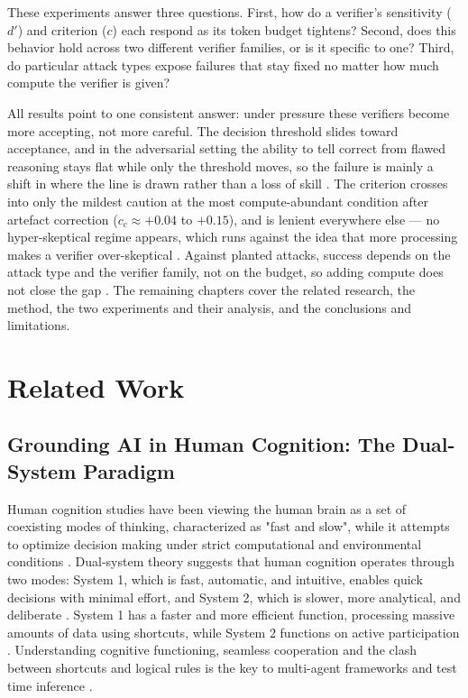 \documentclass[12pt, a4paper, oneside]{report}
\begin{document}
These experiments answer three questions. First, how do a verifier's sensitivity ($d'$) and criterion ($c$) each respond as its token budget tightens? Second, does this behavior hold across two different verifier families, or is it specific to one? Third, do particular attack types expose failures that stay fixed no matter how much compute the verifier is given?

All results point to one consistent answer: under pressure these verifiers become more accepting, not more careful. The decision threshold slides toward acceptance, and in the adversarial setting the ability to tell correct from flawed reasoning stays flat while only the threshold moves, so the failure is mainly a shift in where the line is drawn rather than a loss of skill \parencite{Cacioli2026, Agrawal2026}. 
The criterion crosses into only the mildest caution at the most compute-abundant condition after artefact correction ($c_c \approx +0.04$ to $+0.15$), and is lenient everywhere else — no hyper-skeptical regime appears, which runs against the idea that more processing makes a verifier over-skeptical \parencite{Zhou2026}.
 Against planted attacks, success depends on the attack type and the verifier family, not on the budget, so adding compute does not close the gap \parencite{Juneja2025, Shen2025}. The remaining chapters cover the related research, the method, the two experiments and their analysis, and the conclusions and limitations.



\chapter{Related Work}

\section{Grounding AI in Human Cognition: The Dual-System Paradigm}
Human cognition studies have been viewing the human brain as a set of coexisting modes of thinking, characterized as "fast and slow", while it attempts to optimize decision making under strict computational and environmental conditions \parencite{Hu2026, Kahneman2014}. Dual-system theory suggests that human cognition operates through two modes: System 1, which is fast, automatic, and intuitive, enables quick decisions with minimal effort, and System 2, which is slower, more analytical, and deliberate \parencite{Zhang2025tts, Zhang2025system2}. System 1 has a faster and more efficient function, processing massive amounts of data using shortcuts, while System 2 functions on active participation \parencite{Kahneman2014}. Understanding cognitive functioning, seamless cooperation and the clash between shortcuts and logical rules is the key to multi-agent frameworks and test time inference \parencite{Wu2025}. 
\end{document}
